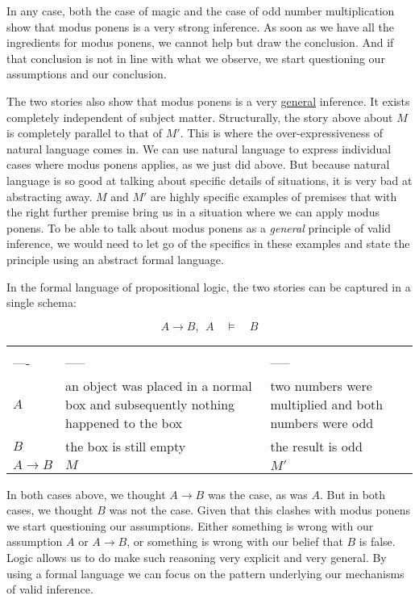 \documentclass[11pt]{article}
\begin{document}
In any case, both the case of magic and the case of odd number multiplication show that modus ponens is a very strong inference. As soon as we have all the ingredients for modus ponens, we cannot help but draw the conclusion. And if that conclusion is not in line with what we observe, we start questioning our assumptions and our conclusion. 

The two stories also show that modus ponens is a very \uline{general} inference. It exists completely independent of subject matter. Structurally, the story above about \(M\) is completely parallel to that of \(M'\). This is where the over-expressiveness of natural language comes in. We can use natural language to express individual cases where modus ponens applies, as we just did above. But because natural language is so good at talking about specific details of situations, it is very bad at abstracting away. \(M\) and \(M'\) are highly specific examples of premises that with the right further premise bring us in a situation where we can apply modus ponens. To be able to talk about modus ponens as a \emph{general} principle of valid inference, we would need to let go of the specifics in these examples and state the principle using an abstract formal language.

In the formal language of propositional logic, the two stories can be captured in a single schema:

$$ A\rightarrow B,\ \ A\quad\models\quad B$$

\begin{center}
\begin{tabular}{lll}
 &  & \\
---- & ----- & -----\\
\(A\) & an object was placed in a normal box  and subsequently nothing happened to the box & two numbers were multiplied and both numbers were odd\\
\(B\) & the box is still empty & the result is odd\\
\(A\rightarrow B\) & \(M\) & \(M'\)\\
\end{tabular}
\end{center}

In both cases above, we thought \(A\rightarrow B\) was the case, as was \(A\). But in both cases, we thought \(B\) was not the case. Given that this clashes with modus ponens we start questioning our assumptions. Either something is wrong with our assumption \(A\) or \(A\rightarrow B\), or something is wrong with our belief that \(B\) is false. Logic allows us to do make such reasoning very explicit and very general. By using a formal language we can focus on the pattern underlying our mechanisms of valid inference.
\end{document}
